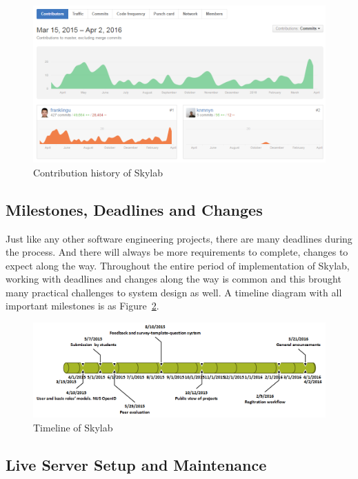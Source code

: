 \begin{figure}[h]
  \centering
  \includegraphics[width=\textwidth]{Images/Skylab_Contribution.png}
  \caption{Contribution history of Skylab}
  \label{fig:SkylabContribution}
\end{figure}

\subsection{Milestones, Deadlines and Changes}

Just like any other software engineering projects, there are many deadlines during the process. And there will always be more requirements to complete, changes to expect along the way. Throughout the entire period of implementation of Skylab, working with deadlines and changes along the way is common and this brought many practical challenges to system design as well. A timeline diagram with all important milestones is as Figure~\ref{fig:SkylabTimeline}.

\begin{figure}[h]
  \centering
  \includegraphics[width=\textwidth]{Images/Skylab_Timeline.png}
  \caption{Timeline of Skylab}
  \label{fig:SkylabTimeline}
\end{figure}

\subsection{Live Server Setup and Maintenance}

